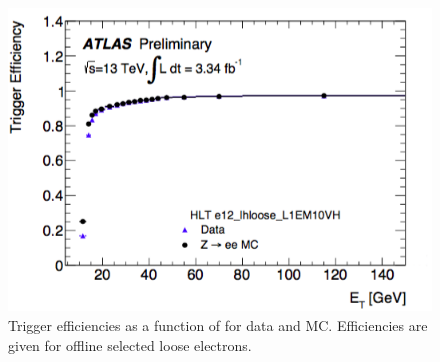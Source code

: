 \begin{centering}
\begin{figure}[!hbt]
\myfloatalign
\includegraphics[width=.90\linewidth]{figures/atlas/el_trig_eff.png}
\caption{Trigger efficiencies as a function of \et for data and \ac{MC}. Efficiencies are given for offline selected loose electrons.}
\label{fig:trig_el_eff}
\end{figure}
\end{centering}



